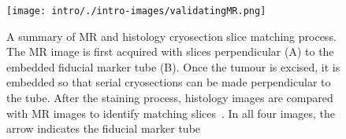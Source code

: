 	\begin{figure}[htbp]
		\begin{center}
		\texttt{[image: intro/./intro-images/validatingMR.png]}
		\caption{A summary of MR and histology cryosection slice matching process. The MR image is first
		acquired with slices perpendicular (A) to the embedded fiducial marker tube (B). Once the
		tumour is excised, it is embedded so that serial cryosections can be made perpendicular to
		the tube. After the staining process, histology images are compared with MR images to
		identify matching slices~\cite{Bains:2009ws}. In all four images, the arrow indicates the
		fiducial marker tube}
		\label{validatingMR}
		\end{center}
	\end{figure}




\endinput

Any text after an \endinput is ignored.
You could put scraps here or things in progress.
